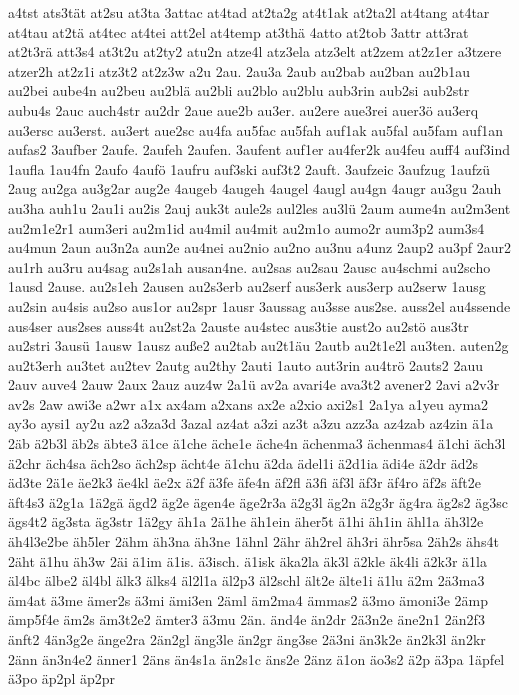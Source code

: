{a4tst
ats3tät
at2su
at3ta
3attac
at4tad
at2ta2g
at4t1ak
at2ta2l
at4tang
at4tar
at4tau
at2tä
at4tec
at4tei
att2el
at4temp
at3thä
4atto
at2tob
3attr
att3rat
at2t3rä
att3s4
at3t2u
at2ty2
atu2n
atze4l
atz3ela
atz3elt
at2zem
at2z1er
a3tzere
atzer2h
at2z1i
atz3t2
at2z3w
a2u
2au.
2au3a
2aub
au2bab
au2ban
au2b1au
au2bei
aube4n
au2beu
au2blä
au2bli
au2blo
au2blu
aub3rin
aub2si
aub2str
aubu4s
2auc
auch4str
au2dr
2aue
aue2b
au3er.
au2ere
aue3rei
auer3ö
au3erq
au3ersc
au3erst.
au3ert
aue2sc
au4fa
au5fac
au5fah
auf1ak
au5fal
au5fam
auf1an
aufas2
3aufber
2aufe.
2aufeh
2aufen.
3aufent
auf1er
au4fer2k
au4feu
auff4
auf3ind
1aufla
1au4fn
2aufo
4aufö
1aufru
auf3ski
auf3t2
2auft.
3aufzeic
3aufzug
1aufzü
2aug
au2ga
au3g2ar
aug2e
4augeb
4augeh
4augel
4augl
au4gn
4augr
au3gu
2auh
au3ha
auh1u
2au1i
au2is
2auj
auk3t
aule2s
aul2les
au3lü
2aum
aume4n
au2m3ent
au2m1e2r1
aum3eri
au2m1id
au4mil
au4mit
au2m1o
aumo2r
aum3p2
aum3s4
au4mun
2aun
au3n2a
aun2e
au4nei
au2nio
au2no
au3nu
a4unz
2aup2
au3pf
2aur2
au1rh
au3ru
au4sag
au2s1ah
ausan4ne.
au2sas
au2sau
2ausc
au4schmi
au2scho
1ausd
2ause.
au2s1eh
2ausen
au2s3erb
au2serf
aus3erk
aus3erp
au2serw
1ausg
au2sin
au4sis
au2so
aus1or
au2spr
1ausr
3aussag
au3sse
aus2se.
auss2el
au4ssende
aus4ser
aus2ses
auss4t
au2st2a
2auste
au4stec
aus3tie
aust2o
au2stö
aus3tr
au2stri
3ausü
1ausw
1ausz
auße2
au2tab
au2t1äu
2autb
au2t1e2l
au3ten.
auten2g
au2t3erh
au3tet
au2tev
2autg
au2thy
2auti
1auto
aut3rin
au4trö
2auts2
2auu
2auv
auve4
2auw
2aux
2auz
auz4w
2a1ü
av2a
avari4e
ava3t2
avener2
2avi
a2v3r
av2s
2aw
awi3e
a2wr
a1x
ax4am
a2xans
ax2e
a2xio
axi2s1
2a1ya
a1yeu
ayma2
ay3o
aysi1
ay2u
az2
a3za3d
3azal
az4at
a3zi
az3t
a3zu
azz3a
az4zab
az4zin
ä1a
2äb
ä2b3l
äb2s
äbte3
ä1ce
ä1che
äche1e
äche4n
ächenma3
ächenmas4
ä1chi
äch3l
ä2chr
äch4sa
äch2so
äch2sp
ächt4e
ä1chu
ä2da
ädel1i
ä2d1ia
ädi4e
ä2dr
äd2s
äd3te
2ä1e
äe2k3
äe4kl
äe2x
ä2f
ä3fe
äfe4n
äf2fl
ä3fi
äf3l
äf3r
äf4ro
äf2s
äft2e
äft4s3
ä2g1a
1ä2gä
ägd2
äg2e
ägen4e
äge2r3a
ä2g3l
äg2n
ä2g3r
äg4ra
äg2s2
äg3sc
ägs4t2
äg3sta
äg3str
1ä2gy
äh1a
2ä1he
äh1ein
äher5t
ä1hi
äh1in
ähl1a
äh3l2e
äh4l3e2be
äh5ler
2ähm
äh3na
äh3ne
1ähnl
2ähr
äh2rel
äh3ri
ähr5sa
2äh2s
ähs4t
2äht
ä1hu
äh3w
2äi
ä1im
ä1is.
ä3isch.
ä1isk
äka2la
äk3l
ä2kle
äk4li
ä2k3r
ä1la
äl4bc
älbe2
äl4bl
älk3
älks4
äl2l1a
äl2p3
äl2schl
ält2e
älte1i
ä1lu
ä2m
2ä3ma3
äm4at
ä3me
ämer2s
ä3mi
ämi3en
2äml
äm2ma4
ämmas2
ä3mo
ämoni3e
2ämp
ämp5f4e
äm2s
äm3t2e2
ämter3
ä3mu
2än.
änd4e
än2dr
2ä3n2e
äne2n1
2än2f3
änft2
4än3g2e
änge2ra
2än2gl
äng3le
än2gr
äng3se
2ä3ni
än3k2e
än2k3l
än2kr
2änn
än3n4e2
änner1
2äns
än4s1a
än2s1c
äns2e
2änz
ä1on
äo3s2
ä2p
ä3pa
1äpfel
ä3po
äp2pl
äp2pr
}
